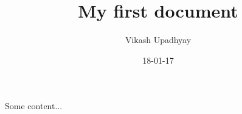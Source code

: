 \documentclass{article}
\title{My first document}
\date{18-01-17}
\author{Vikash Upadhyay}
\begin{document}
\maketitle

\newpage
{}
 
 Some content...
\end{document}
